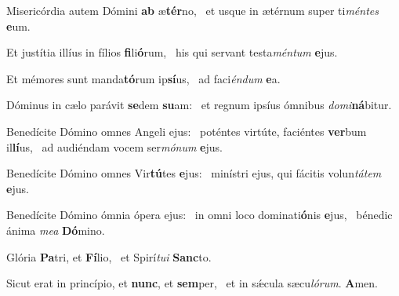 \item Misericórdia autem Dómini \textbf{ab} æ\textbf{tér}no,~\psstar{} et usque in ætérnum super ti\textit{méntes} \textbf{e}um.
\item Et justítia illíus in fílios \textbf{fi}li\textbf{ó}rum,~\psstar{} his qui servant testa\textit{méntum} \textbf{e}jus.
\item Et mémores sunt manda\textbf{tó}rum ip\textbf{sí}us,~\psstar{} ad faci\textit{éndum} \textbf{e}a.
\item Dóminus in cælo parávit \textbf{se}dem \textbf{su}am:~\psstar{} et regnum ipsíus ómnibus \textit{domi}\textbf{ná}bitur.
\item Benedícite Dómino omnes Angeli ejus:~\pscross{} poténtes virtúte, faciéntes \textbf{ver}bum il\textbf{lí}us,~\psstar{} ad audiéndam vocem ser\textit{mónum} \textbf{e}jus.
\item Benedícite Dómino omnes Vir\textbf{tú}tes \textbf{e}jus:~\psstar{} minístri ejus, qui fácitis volun\textit{tátem} \textbf{e}jus.
\item Benedícite Dómino ómnia ópera ejus:~\pscross{} in omni loco dominati\textbf{ó}nis \textbf{e}jus,~\psstar{} bénedic ánima \textit{mea} \textbf{Dó}mino.
\item Glória \textbf{Pa}tri, et \textbf{Fí}lio,~\psstar{} et Spirí\textit{tui} \textbf{Sanc}to.
\item Sicut erat in princípio, et \textbf{nunc}, et \textbf{sem}per,~\psstar{} et in sǽcula sæcu\textit{lórum}. \textbf{A}men.
